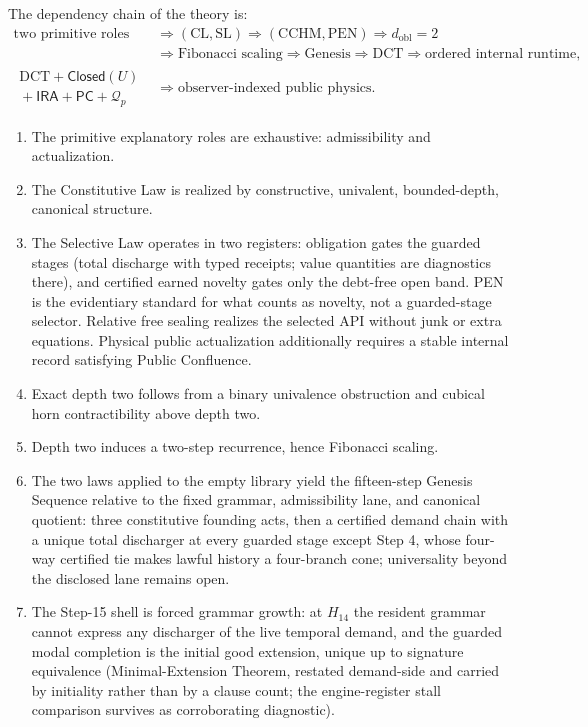\documentclass[11pt]{article}
\theoremstyle{plain}
\theoremstyle{definition}
\theoremstyle{remark}
\newcommand{\CL}{\mathrm{CL}}
\newcommand{\SLaw}{\mathrm{SL}}
\newcommand{\PEN}{\mathrm{PEN}}
\newcommand{\DCT}{\mathrm{DCT}}
\newcommand{\CCHM}{\mathrm{CCHM}}
\begin{document}
The dependency chain of the theory is:
\[
\begin{aligned}
\text{two primitive roles}
&\Rightarrow
(\CL,\SLaw)
\Rightarrow
(\CCHM,\PEN)
\Rightarrow
d_{\mathrm{obl}}=2
\\
&\Rightarrow
\text{Fibonacci scaling}
\Rightarrow
\text{Genesis}
\Rightarrow
\DCT
\Rightarrow
\text{ordered internal runtime},
\\
\substack{\DCT+\mathsf{Closed}(U)\\[-0.2em]{}+\mathsf{IRA}+\mathsf{PC}+\mathcal{Q}_p}
&\Rightarrow
\text{observer-indexed public physics}.
\end{aligned}
\]

\begin{enumerate}[leftmargin=*]
\item The primitive explanatory roles are exhaustive: admissibility and actualization.
\item The Constitutive Law is realized by constructive, univalent, bounded-depth, canonical structure.
\item The Selective Law operates in two registers: obligation gates the guarded stages (total discharge with typed receipts; value quantities are diagnostics there), and certified earned novelty gates only the debt-free open band. PEN is the evidentiary standard for what counts as novelty, not a guarded-stage selector. Relative free sealing realizes the selected API without junk or extra equations. Physical public actualization additionally requires a stable internal record satisfying Public Confluence.
\item Exact depth two follows from a binary univalence obstruction and cubical horn contractibility above depth two.
\item Depth two induces a two-step recurrence, hence Fibonacci scaling.
\item The two laws applied to the empty library yield the fifteen-step Genesis Sequence relative to the fixed grammar, admissibility lane, and canonical quotient: three constitutive founding acts, then a certified demand chain with a unique total discharger at every guarded stage except Step 4, whose four-way certified tie makes lawful history a four-branch cone; universality beyond the disclosed lane remains open.
\item The Step-15 shell is forced grammar growth: at \(H_{14}\) the resident grammar cannot express any discharger of the live temporal demand, and the guarded modal completion is the initial good extension, unique up to signature equivalence (Minimal-Extension Theorem, restated demand-side and carried by initiality rather than by a clause count; the engine-register stall comparison survives as corroborating diagnostic).

\end{enumerate}
\end{document}

